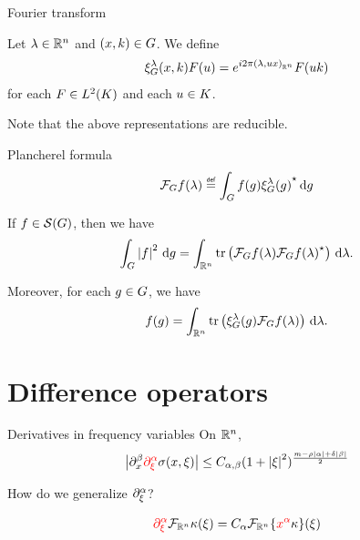 \documentclass[handout]{beamer}
\begin{document}
\begin{frame}{Fourier transform}
    \begin{definition}[Representations]
        Let $\lambda \in \R^n$ and $(x, k) \in \Group$.
        We define
        \begin{align*}
            \Rep \lambda(x, k) F(u)
            = \e^{\i \turn \ip [\R^n] \lambda {u x}} F(u k)
        \end{align*}
        for each $F \in \Lebesgue 2 \CompactGroup$ and each $u \in \CompactGroup$.
    \end{definition}

    Note that the above representations are reducible.
\end{frame}

\begin{frame}{Plancherel formula}
    \begin{align*}
        \Fourier f(\lambda) \defeq \int_\Group f(g) \adj{\Rep \lambda(g)} \dd g
    \end{align*}

    \pause

    \begin{theorem}
        If $f \in \Schwartz \Group$,
        then we have
        \begin{align*}
            \int_\Group \abs f^2 \dd g
            = \int_{\R^n} \tr \left(\Fourier f(\lambda) \adj {\Fourier f(\lambda)}\right) \dd \lambda.
        \end{align*}

        Moreover,
        for each $g \in \Group$, we have
        \begin{align*}
            f(g)
            = \int_{\R^n} \tr \left(\Rep \lambda(g) \Fourier f(\lambda)\right) \dd \lambda.
        \end{align*}
    \end{theorem}
\end{frame}

\section{Difference operators}

\begin{frame}{Derivatives in frequency variables}
    On $\R^n$,
    \begin{align*}
        \abs {\iD {x^\beta} {\color{red} \iD {\xi^\alpha}} \sigma(x, \xi)}
        \leq C_{\alpha, \beta} (1 + \abs \xi^2)^{\frac {m - \rho \abs \alpha + \delta \abs \beta} 2}
    \end{align*}

    How do we generalize $\iD {\xi^\alpha}$?

    \pause

    \begin{align*}
        {\color{red} \iD {\xi^\alpha}} \Fourier [\R^n] \kappa(\xi)
        = C_\alpha \Fourier [\R^n] {\{{\color{red} x^\alpha} \kappa\}}(\xi)
    \end{align*}
\end{frame}
\end{document}
